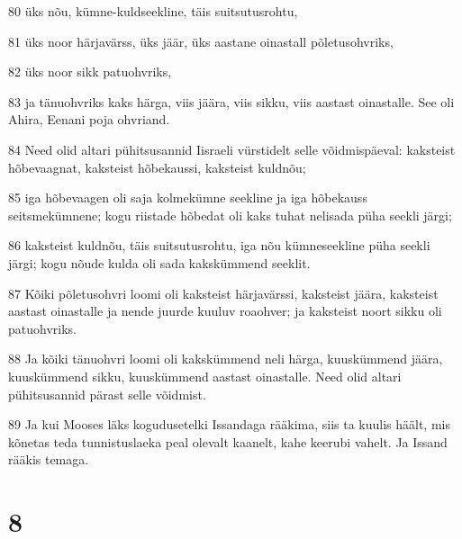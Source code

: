 \par 80 üks nõu, kümne-kuldseekline, täis suitsutusrohtu,
\par 81 üks noor härjavärss, üks jäär, üks aastane oinastall põletusohvriks,
\par 82 üks noor sikk patuohvriks,
\par 83 ja tänuohvriks kaks härga, viis jäära, viis sikku, viis aastast oinastalle. See oli Ahira, Eenani poja ohvriand.
\par 84 Need olid altari pühitsusannid Iisraeli vürstidelt selle võidmispäeval: kaksteist hõbevaagnat, kaksteist hõbekaussi, kaksteist kuldnõu;
\par 85 iga hõbevaagen oli saja kolmekümne seekline ja iga hõbekauss seitsmekümnene; kogu riistade hõbedat oli kaks tuhat nelisada püha seekli järgi;
\par 86 kaksteist kuldnõu, täis suitsutusrohtu, iga nõu kümneseekline püha seekli järgi; kogu nõude kulda oli sada kakskümmend seeklit.
\par 87 Kõiki põletusohvri loomi oli kaksteist härjavärssi, kaksteist jäära, kaksteist aastast oinastalle ja nende juurde kuuluv roaohver; ja kaksteist noort sikku oli patuohvriks.
\par 88 Ja kõiki tänuohvri loomi oli kakskümmend neli härga, kuuskümmend jäära, kuuskümmend sikku, kuuskümmend aastast oinastalle. Need olid altari pühitsusannid pärast selle võidmist.
\par 89 Ja kui Mooses läks kogudusetelki Issandaga rääkima, siis ta kuulis häält, mis kõnetas teda tunnistuslaeka peal olevalt kaanelt, kahe keerubi vahelt. Ja Issand rääkis temaga.

\chapter{8}


